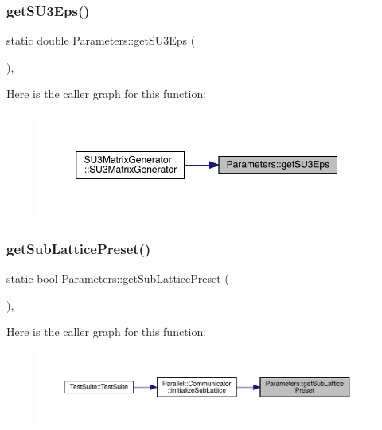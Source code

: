 \subsubsection{\texorpdfstring{getSU3Eps()}{getSU3Eps()}}
{\footnotesize\ttfamily static double Parameters\+::get\+S\+U3\+Eps (\begin{DoxyParamCaption}{ }\end{DoxyParamCaption})\hspace{0.3cm}{\ttfamily [inline]}, {\ttfamily [static]}}

Here is the caller graph for this function\+:
\nopagebreak
\begin{figure}[H]
\begin{center}
\leavevmode
\includegraphics[width=350pt]{class_parameters_ac14d1b11099fdfa254fb138d4471ceb2_icgraph}
\end{center}
\end{figure}
\mbox{\label{class_parameters_ab9d9f206373cdad11d48ab08222204e3}} 
\subsubsection{\texorpdfstring{getSubLatticePreset()}{getSubLatticePreset()}}
{\footnotesize\ttfamily static bool Parameters\+::get\+Sub\+Lattice\+Preset (\begin{DoxyParamCaption}{ }\end{DoxyParamCaption})\hspace{0.3cm}{\ttfamily [inline]}, {\ttfamily [static]}}

Here is the caller graph for this function\+:
\nopagebreak
\begin{figure}[H]
\begin{center}
\leavevmode
\includegraphics[width=350pt]{class_parameters_ab9d9f206373cdad11d48ab08222204e3_icgraph}
\end{center}
\end{figure}
\mbox{\label{class_parameters_aff629ab94d99807364926008fb4e1e67}} 
